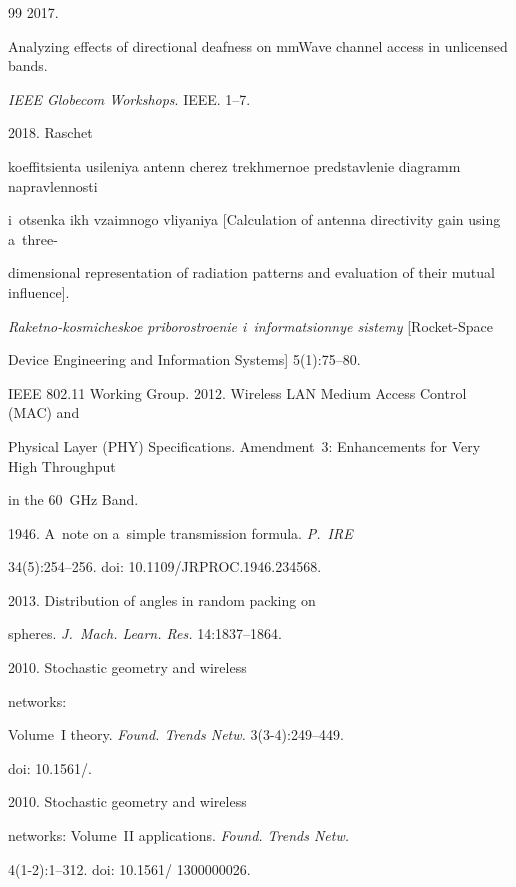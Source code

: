 {{\begin{thebibliography}{99}
 2017. 


Analyzing effects of directional deafness on mmWave channel access in unlicensed bands. 


\textit{IEEE Globecom Workshops}. IEEE.  1--7. 




 2018. Raschet 


ko\-ef\-fi\-tsi\-en\-ta usileniya antenn cherez trekhmernoe predstavlenie diagramm napravlennosti 


i~otsenka ikh vzaimnogo vliyaniya [Calculation of antenna directivity gain using a~three-


dimensional representation of radiation patterns and evaluation of their mutual influence]. 


\textit{Raketno-kosmicheskoe priborostroenie i~informatsionnye sistemy} [Rocket-Space 


Device Engineering and Information Systems] 5(1):75--80.




IEEE 802.11 Working Group. 2012. Wireless LAN Medium Access Control (MAC) and 


Physical Layer (PHY) Specifications. Amendment~3: Enhancements for Very High Throughput 


in the 60~GHz Band. 




 1946. A~note on a~simple transmission formula. \textit{P.~IRE}  


34(5):254--256. doi: 10.1109/JRPROC.1946.234568.




 2013. Distribution of angles in random packing on 


spheres. \textit{J.~Mach. Learn. Res.} 14:1837--1864.




 2010. Stochastic geometry and wireless 


networks:


Volume~I theory. \textit{Found. Trends Netw.} 3(3-4):249--449. 


doi: 10.1561\!/.









2010. Stochastic geometry and wireless 


networks: Volume~II applications. \textit{Found. Trends Netw.} 


 4(1-2):1--312. doi: 10.1561\!/ 1300000026.





\end{thebibliography}


} }
